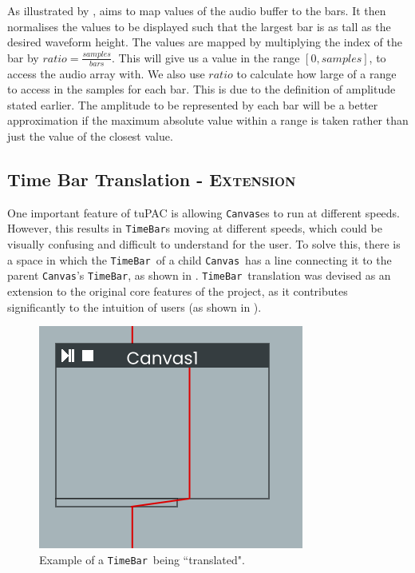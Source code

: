 \documentclass[12pt,a4paper,oneside,openright]{report}
\newcommand{\canvas}{\texttt{Canvas}}
\newcommand{\timebar}{\texttt{TimeBar}}
\begin{document}
As illustrated by ,  aims to map values of the audio buffer to the bars. It then normalises the values to be displayed such that the largest bar is as tall as the desired waveform height. The values are mapped by multiplying the index of the bar by $ratio = \frac{samples}{bars}$. This will give us a value in the range $[0,samples]$, to access the audio array with. We also use $ratio$ to calculate how large of a range to access in the samples for each bar. This is due to the definition of amplitude stated earlier. The amplitude to be represented by each bar will be a better approximation if the maximum absolute value within a range is taken rather than just the value of the closest value.

\subsection{Time Bar Translation - \normalfont\textbf{\textsc{Extension}}}\label{sec:timebar_translate}
One important feature of tuPAC is allowing \canvas es to run at different speeds. However, this results in \timebar s moving at different speeds, which could be visually confusing and difficult to understand for the user. To solve this, there is a space in which the \timebar\ of a child \canvas\ has a line connecting it to the parent \canvas's \timebar, as shown in . \timebar\ translation was devised as an extension to the original core features of the project, as it contributes significantly to the intuition of users (as shown in ).


\begin{figure}[h!]
    \centering
    \includegraphics{images/timebartranslate.png}
    \caption{Example of a \timebar\ being ``translated".}
    \label{fig:timebartranslation}
\end{figure}
\end{document}
